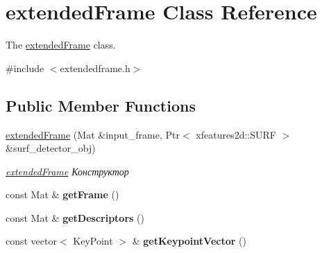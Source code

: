 \hypertarget{classextended_frame}{}\section{extended\+Frame Class Reference}
\label{classextended_frame}


The \hyperlink{classextended_frame}{extended\+Frame} class.  




{\ttfamily \#include $<$extendedframe.\+h$>$}

\subsection*{Public Member Functions}
\begin{DoxyCompactItemize}
\item 
\hyperlink{classextended_frame_a22ce1e80c5583831eb81ac280c544136}{extended\+Frame} (Mat \&input\+\_\+frame, Ptr$<$ xfeatures2d\+::\+S\+U\+RF $>$ \&surf\+\_\+detector\+\_\+obj)
\begin{DoxyCompactList}\small\item\em \hyperlink{classextended_frame}{extended\+Frame} Конструктор \end{DoxyCompactList}\item 
\mbox{\label{classextended_frame_a153ceb6cb957d38900f172c6ab11091c}} 
const Mat \& {\bfseries get\+Frame} ()
\item 
\mbox{\label{classextended_frame_a795d9683335223e7d5e699f36d500e32}} 
const Mat \& {\bfseries get\+Descriptors} ()
\item 
\mbox{\label{classextended_frame_a15f7d722562941cbcd672aa96153ae44}} 
const vector$<$ Key\+Point $>$ \& {\bfseries get\+Keypoint\+Vector} ()
\end{DoxyCompactItemize}

